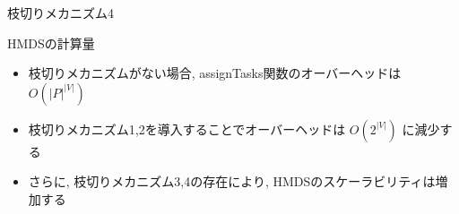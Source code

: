 \begin{frame}{枝切りメカニズム4}
\end{frame}

\begin{frame}{HMDSの計算量}
    \begin{itemize}
        \item 枝切りメカニズムがない場合, assignTasks関数のオーバーヘッドは $O(|P|^{|V|})$
        \item 枝切りメカニズム1,2を導入することでオーバーヘッドは $O(2^{|V|})$ に減少する
        \item さらに, 枝切りメカニズム3,4の存在により, HMDSのスケーラビリティは増加する
    \end{itemize}
\end{frame}
